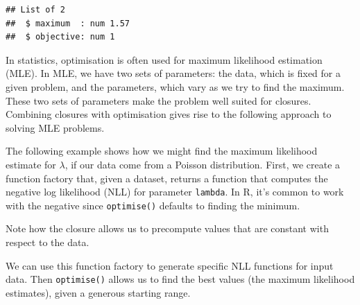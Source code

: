 \begin{verbatim}
## List of 2
##  $ maximum  : num 1.57
##  $ objective: num 1
\end{verbatim}

In statistics, optimisation is often used for maximum likelihood
estimation (MLE). In MLE, we have two sets of parameters: the data,
which is fixed for a given problem, and the parameters, which vary as we
try to find the maximum. These two sets of parameters make the problem
well suited for closures. Combining closures with optimisation gives
rise to the following approach to solving MLE problems.

The following example shows how we might find the maximum likelihood
estimate for \(\lambda\), if our data come from a Poisson distribution.
First, we create a function factory that, given a dataset, returns a
function that computes the negative log likelihood (NLL) for parameter
\texttt{lambda}. In R, it's common to work with the negative since
\texttt{optimise()} defaults to finding the minimum.

\begin{Shaded}
\begin{Highlighting}[]
\StringTok{ }
\StringTok{ }
\StringTok{ }
\OperatorTok{*}\StringTok{ }\OperatorTok{-}\StringTok{ }\OperatorTok{*}\StringTok{ }
\NormalTok{  \}}
\NormalTok{\}}
\end{Highlighting}
\end{Shaded}

Note how the closure allows us to precompute values that are constant
with respect to the data.

We can use this function factory to generate specific NLL functions for
input data. Then \texttt{optimise()} allows us to find the best values
(the maximum likelihood estimates), given a generous starting range.

